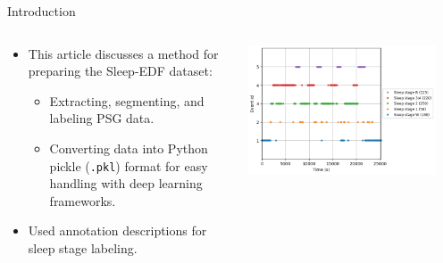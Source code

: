 \begin{frame}{Introduction }
	\begin{columns}[c]
		\begin{column}{0.48\textwidth}
			
			\begin{itemize}
				\item This article discusses a method for preparing the Sleep-EDF dataset:
				\begin{itemize}
					\item Extracting, segmenting, and labeling PSG data.
					\item Converting data into Python pickle (\texttt{.pkl}) format for easy handling with deep learning frameworks.
				\end{itemize}
				\item Used annotation descriptions for sleep stage labeling.
			\end{itemize}
		\end{column}
		\begin{column}{0.48\textwidth}
			\centering
			\includegraphics[width=0.9\textwidth]{images/paper_2/sleep event.png}
		\end{column}
	\end{columns}
\end{frame}
